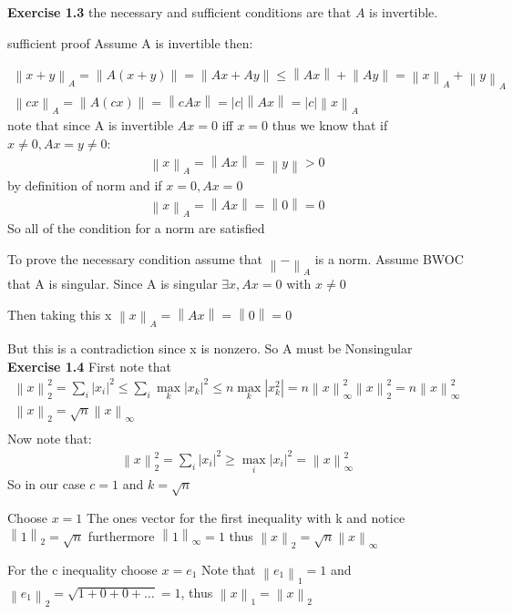 \documentclass[12pt]{article}
\newenvironment{exercise}[1]{\vspace{.1in}\noindent\textbf{Exercise #1 \hspace{.05em}}}{}
\newcommand{\norm}[1]{\left\lVert#1\right\rVert}
\begin{document}
\begin{exercise}{1.3}
	the necessary and sufficient conditions are that $A$ is invertible.

	sufficient proof Assume A is invertible then:

	\begin{align}
		\norm{x+y}_A=\norm{A(x+y)}=\norm{Ax+Ay}\leq \norm{Ax}+\norm{Ay}=\norm{x}_A+\norm{y}_A \\
		\norm{cx}_A=\norm{A(cx)}=\norm{cAx}=|c|\norm{Ax}=|c|\norm{x}_A
	\end{align}
	note that since A is invertible $Ax=0$ iff $x=0$ thus we know that if $x\neq 0,Ax=y\neq 0$:
	\begin{align}
		\norm{x}_A=\norm{Ax}=\norm{y}> 0
	\end{align}
	by definition of norm and if $x=0, Ax=0 $
	\begin{align}
		\norm{x}_A=\norm{Ax}=\norm{0}=0
	\end{align}
	So all of the condition for a norm are satisfied

	To prove the necessary condition assume that $\norm{-}_A$ is a norm. Assume BWOC that A is singular. Since A is singular $\exists x, Ax=0$ with $x\neq 0$

	Then taking this x $\norm{x}_A=\norm{Ax}=\norm{0}=0$

	But this is a contradiction since x is nonzero. So A must be Nonsingular
\end{exercise}
\begin{exercise}{1.4}
	First note that
	\begin{align}
		\norm{x}^2_2=\sum_i |x_i|^2\leq \sum_i \max_k|x_k|^2 \leq n\max_k |x_k^2|=n \norm{x}_\infty^2
		\norm{x}^2_2=n\norm{x}_\infty^2    \\
		\norm{x}_2=\sqrt{n}\norm{x}_\infty \\
	\end{align}
	Now note that:
	\begin{align}
		\norm{x}_2^2=\sum_i |x_i|^2\geq \max_i|x_i|^2=\norm{x}_\infty^2
	\end{align}
	So in our case $c=1$ and $k=\sqrt{n}$

	Choose $x=1$ The ones vector for the first inequality with k and notice $\norm{1}_2=\sqrt{n}$ furthermore $\norm{1}_\infty=1$ thus $\norm{x}_2=\sqrt{n}\norm{x}_\infty$

	For the c inequality choose $x=e_1$ Note that $\norm{e_1}_1=1$ and $\norm{e_1}_2=\sqrt{1+0+0+\dots}=1$, thus $\norm{x}_1=\norm{x}_2$
\end{exercise}
\end{document}
